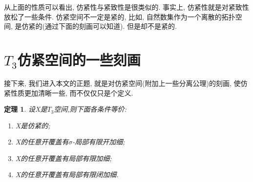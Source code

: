 \documentclass[a4paper,UTF8]{ctexart}
\newtheorem{thm}[theorem]{定理} %
\begin{document}
从上面的性质可以看出, 仿紧性与紧致性是很类似的.
事实上, 仿紧性就是对紧致性放松了一些条件. 仿紧空间不一定是紧的,
比如, 自然数集作为一个离散的拓扑空间, 是仿紧的(通过下面的刻画可以知道).
但是却不是紧的.

\section{$T_3$仿紧空间的一些刻画}
接下来, 我们进入本文的正题, 就是对仿紧空间(附加上一些分离公理)的刻画,
使仿紧性质更加清晰一些, 而不仅仅只是个定义.

\begin{thm} \label{thm:paracompact sigma finite}
  设X是$T_3$空间,则下面各条件等价:
  \begin{enumerate}
  \item X是仿紧的;
  \item X的任意开覆盖有$\sigma$-局部有限开加细;
  \item X的任意开覆盖有局部有限加细;
  \item X的任意开覆盖有局部有限闭加细.
  \end{enumerate}
\end{thm}
\end{document}
